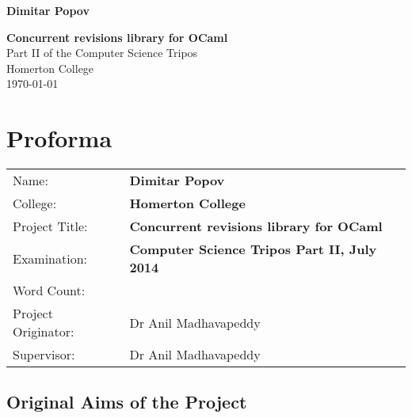 \documentclass[12pt,twoside,notitlepage]{report}
\begin{document}





\pagestyle{empty}

\hfill{\LARGE \bf Dimitar Popov}

\vspace*{60mm}
\begin{center}
\Huge
{\bf Concurrent revisions library for OCaml} \\
\vspace*{5mm}
Part II of the Computer
Science Tripos\\
\vspace*{5mm}
Homerton College \\
\vspace*{5mm}
\today  %
\end{center}

\cleardoublepage


\setcounter{page}{1}
\pagestyle{plain}

\chapter*{Proforma}

{\large
\begin{tabular}{ll} 
Name:               & \bf Dimitar Popov                     \\
College:            & \bf Homerton College                     \\
Project Title:      & \bf Concurrent revisions library for OCaml \\
Examination:        & \bf Computer Science Tripos Part II, July 2014        \\
Word Count:         & %
\\
Project Originator: & Dr Anil Madhavapeddy                    \\
Supervisor:         & Dr Anil Madhavapeddy                    \\ 
\end{tabular}
}


\section*{Original Aims of the Project}
\end{document}
